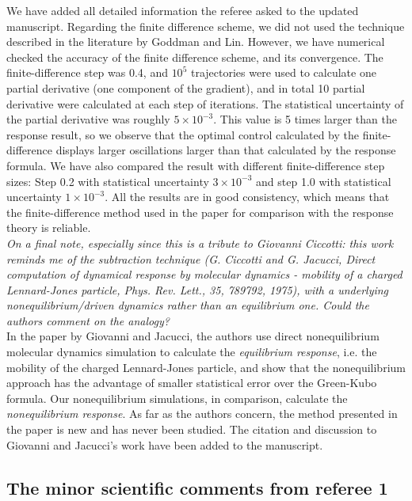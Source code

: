 \documentclass[]{revtex4-1}
\begin{document}
We have added all detailed information the referee asked to the updated
manuscript. Regarding the finite difference scheme, we did not used
the technique described in the literature by Goddman and Lin.
However, we have numerical checked the accuracy of the finite
difference scheme, and its convergence.  The finite-difference step
was 0.4, and $10^5$ trajectories were used to calculate one
partial derivative (one component of the gradient), and in total
10 partial derivative were calculated at each step of iterations.
The statistical uncertainty of the
partial derivative was roughly
$5\times 10^{-3}$.  This value is 5 times larger than the
response result, so we observe that the optimal control calculated
by the finite-difference displays larger oscillations
larger than that calculated
by the response formula. We have also compared the result with 
different finite-difference step sizes:  Step 0.2 with
statistical uncertainty $3\times 10^{-3}$ 
and step 1.0 with statistical uncertainty
$1\times 10^{-3}$.
All the results are in good consistency, which means
that the finite-difference method used  in the paper for comparison with
the response theory is reliable.\\

\emph{
On a final note, especially since this is a tribute to Giovanni Ciccotti: this work reminds
me of the subtraction technique (G. Ciccotti and G. Jacucci, Direct computation of dynamical
response by molecular dynamics - mobility of a charged Lennard-Jones particle, Phys. Rev.
Lett., 35, 789792, 1975), with a underlying nonequilibrium/driven dynamics rather than an
equilibrium one. Could the authors comment on the analogy?
}\\

In the paper by Giovanni and Jacucci, the authors use direct
nonequilibrium molecular dynamics simulation to 
calculate the \emph{equilibrium response}, i.e. the mobility of the charged
Lennard-Jones particle, and show that
the nonequilibrium approach has the advantage of smaller statistical error over
the Green-Kubo formula. Our  nonequilibrium simulations,
in comparison, calculate the
\emph{nonequilibrium response}.
As far as the authors concern, the method presented in the paper is new and
has never been studied. The citation and discussion to Giovanni and Jacucci's
work have been added to the manuscript.


\subsection*{The minor scientific comments from referee 1}
\end{document}
